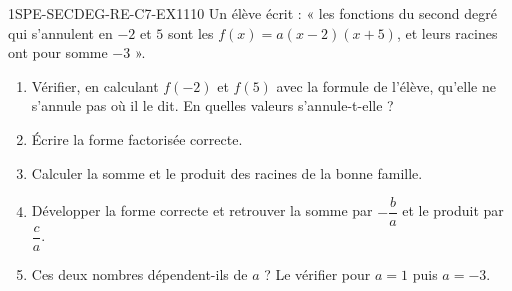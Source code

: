 

\begin{exercice}{1SPE-SECDEG-RE-C7-EX1}{1}{10}
Un élève écrit : « les fonctions du second degré qui s'annulent en $-2$ et $5$
sont les $f(x) = a(x - 2)(x + 5)$, et leurs racines ont pour somme $-3$ ».
\begin{enumerate}
  \item Vérifier, en calculant $f(-2)$ et $f(5)$ avec la formule de l'élève,
    qu'elle ne s'annule pas où il le dit. En quelles valeurs s'annule-t-elle ?
  \item Écrire la forme factorisée correcte.
  \item Calculer la somme et le produit des racines de la bonne famille.
  \item Développer la forme correcte et retrouver la somme par
    $-\dfrac{b}{a}$ et le produit par $\dfrac{c}{a}$.
  \item Ces deux nombres dépendent-ils de $a$ ? Le vérifier pour $a = 1$ puis
    $a = -3$.
\end{enumerate}
\end{exercice}



